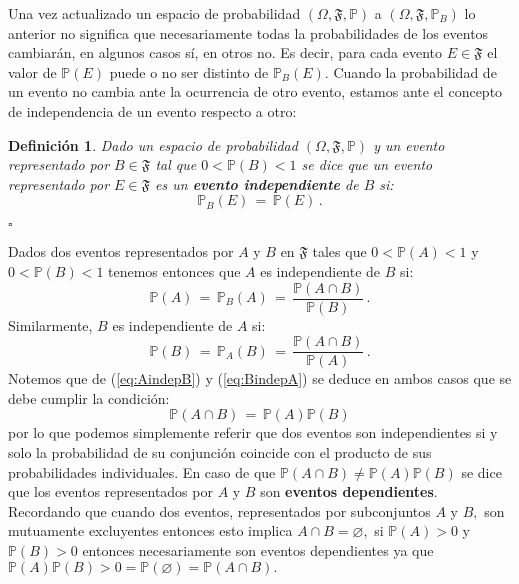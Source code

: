 \documentclass[spanish,10pt,letterpaper]{article}
\newtheorem{defi}{Definición}
\newcommand{\prob}{\mathbb{P}}
\newcommand{\qed}{\begin{flushright}$\square$\end{flushright}}
\begin{document}
	\medskip 
	
	Una vez actualizado un espacio de probabilidad $(\Omega,\mathfrak{F},\prob)$ a $(\Omega,\mathfrak{F},\prob_B)$ lo anterior no significa que necesariamente todas la probabilidades de los eventos cambiarán, en algunos casos sí, en otros no. Es decir, para cada evento $E\in\mathfrak{F}$ el valor de $\prob(E)$ puede o no ser distinto de $\prob_B(E).$ Cuando la probabilidad de un evento no cambia ante la ocurrencia de otro evento, estamos ante el concepto de independencia de un evento respecto a otro:
	
	\bigskip 
	
	\begin{defi}\label{def:indep2}
		Dado un espacio de probabilidad $(\Omega,\mathfrak{F},\prob)$ y un evento representado por $B\in\mathfrak{F}$ tal que $0<\prob(B)<1$ se dice que un evento representado por $E\in\mathfrak{F}$ es un \textbf{evento independiente} de $B$ si: $$\prob_B(E)\,=\,\prob(E)\,.$$ \qed 
	\end{defi}
	
	
	Dados dos eventos representados por $A$ y $B$ en $\mathfrak{F}$ tales que $0<\prob(A)<1$ y $0<\prob(B)<1$ tenemos entonces que $A$ es independiente de $B$ si:
	\begin{equation}\label{eq:AindepB}
		\prob(A) \,=\, \prob_B(A) \,=\, \frac{\prob(A\cap B)}{\prob(B)}\,.	
	\end{equation}
	Similarmente, $B$ es independiente de $A$ si:
	\begin{equation}\label{eq:BindepA}
		\prob(B) \,=\, \prob_A(B) \,=\, \frac{\prob(A\cap B)}{\prob(A)}\,.	
	\end{equation}
	Notemos que de (\ref{eq:AindepB}) y (\ref{eq:BindepA}) se deduce en ambos casos que se debe cumplir la condición:
	\begin{equation}\label{eq:indepeventos}
		\prob(A\cap B) \,=\, \prob(A)\prob(B)
	\end{equation}
	por lo que podemos simplemente referir que dos eventos son independientes si y solo la probabilidad de su conjunción coincide con el producto de sus probabilidades individuales. En caso de que $\prob(A\cap B)\neq\prob(A)\prob(B)$ se dice que los eventos representados por $A$ y $B$ son \textbf{eventos dependientes}. Recordando que cuando dos eventos, representados por subconjuntos $A$ y $B,$ son mutuamente excluyentes entonces esto implica $A\cap B=\varnothing,$ si $\prob(A)>0$ y $\prob(B)>0$ entonces necesariamente son eventos dependientes ya que $\prob(A)\prob(B)>0=\prob(\varnothing)=\prob(A\cap B).$
	
\end{document}
